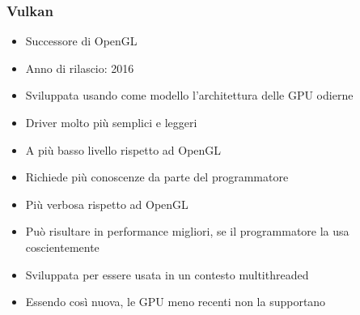 \begin{frame}
\frametitle{Vulkan}

\begin{itemize}
\item Successore di OpenGL
\item Anno di rilascio: 2016
\item Sviluppata usando come modello l'architettura delle GPU odierne
\item Driver molto più semplici e leggeri
\item A più basso livello rispetto ad OpenGL
\item Richiede più conoscenze da parte del programmatore
\item Più verbosa rispetto ad OpenGL
\item Può risultare in performance migliori, se il programmatore la usa coscientemente
\item Sviluppata per essere usata in un contesto multithreaded
\item Essendo così nuova, le GPU meno recenti non la supportano
\end{itemize}

\end{frame}
